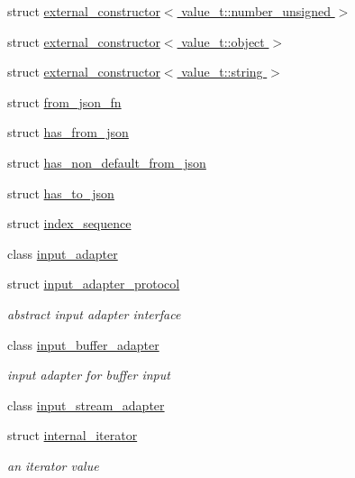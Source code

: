 \begin{DoxyCompactItemize}
\item 
struct \hyperlink{structnlohmann_1_1detail_1_1external__constructor_3_01value__t_1_1number__unsigned_01_4}{external\+\_\+constructor$<$ value\+\_\+t\+::number\+\_\+unsigned $>$}
\item 
struct \hyperlink{structnlohmann_1_1detail_1_1external__constructor_3_01value__t_1_1object_01_4}{external\+\_\+constructor$<$ value\+\_\+t\+::object $>$}
\item 
struct \hyperlink{structnlohmann_1_1detail_1_1external__constructor_3_01value__t_1_1string_01_4}{external\+\_\+constructor$<$ value\+\_\+t\+::string $>$}
\item 
struct \hyperlink{structnlohmann_1_1detail_1_1from__json__fn}{from\+\_\+json\+\_\+fn}
\item 
struct \hyperlink{structnlohmann_1_1detail_1_1has__from__json}{has\+\_\+from\+\_\+json}
\item 
struct \hyperlink{structnlohmann_1_1detail_1_1has__non__default__from__json}{has\+\_\+non\+\_\+default\+\_\+from\+\_\+json}
\item 
struct \hyperlink{structnlohmann_1_1detail_1_1has__to__json}{has\+\_\+to\+\_\+json}
\item 
struct \hyperlink{structnlohmann_1_1detail_1_1index__sequence}{index\+\_\+sequence}
\item 
class \hyperlink{classnlohmann_1_1detail_1_1input__adapter}{input\+\_\+adapter}
\item 
struct \hyperlink{structnlohmann_1_1detail_1_1input__adapter__protocol}{input\+\_\+adapter\+\_\+protocol}
\begin{DoxyCompactList}\small\item\em abstract input adapter interface \end{DoxyCompactList}\item 
class \hyperlink{classnlohmann_1_1detail_1_1input__buffer__adapter}{input\+\_\+buffer\+\_\+adapter}
\begin{DoxyCompactList}\small\item\em input adapter for buffer input \end{DoxyCompactList}\item 
class \hyperlink{classnlohmann_1_1detail_1_1input__stream__adapter}{input\+\_\+stream\+\_\+adapter}
\item 
struct \hyperlink{structnlohmann_1_1detail_1_1internal__iterator}{internal\+\_\+iterator}
\begin{DoxyCompactList}\small\item\em an iterator value \end{DoxyCompactList}\item 

\end{DoxyCompactItemize}
